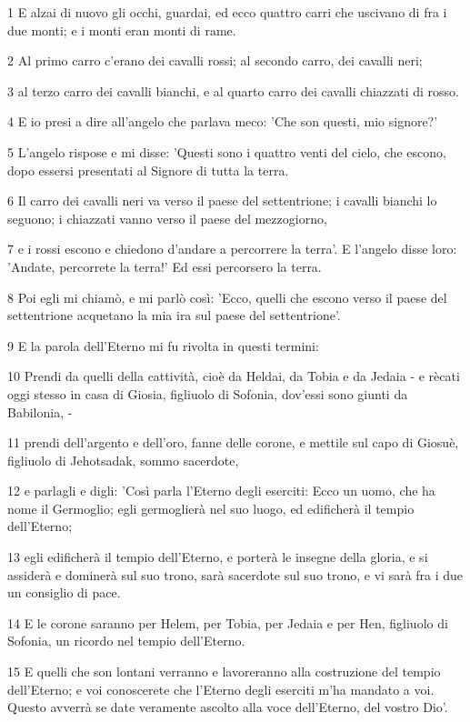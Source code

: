 \par 1 E alzai di nuovo gli occhi, guardai, ed ecco quattro carri che uscivano di fra i due monti; e i monti eran monti di rame.
\par 2 Al primo carro c'erano dei cavalli rossi; al secondo carro, dei cavalli neri;
\par 3 al terzo carro dei cavalli bianchi, e al quarto carro dei cavalli chiazzati di rosso.
\par 4 E io presi a dire all'angelo che parlava meco: 'Che son questi, mio signore?'
\par 5 L'angelo rispose e mi disse: 'Questi sono i quattro venti del cielo, che escono, dopo essersi presentati al Signore di tutta la terra.
\par 6 Il carro dei cavalli neri va verso il paese del settentrione; i cavalli bianchi lo seguono; i chiazzati vanno verso il paese del mezzogiorno,
\par 7 e i rossi escono e chiedono d'andare a percorrere la terra'. E l'angelo disse loro: 'Andate, percorrete la terra!' Ed essi percorsero la terra.
\par 8 Poi egli mi chiamò, e mi parlò così: 'Ecco, quelli che escono verso il paese del settentrione acquetano la mia ira sul paese del settentrione'.
\par 9 E la parola dell'Eterno mi fu rivolta in questi termini:
\par 10 Prendi da quelli della cattività, cioè da Heldai, da Tobia e da Jedaia - e rècati oggi stesso in casa di Giosia, figliuolo di Sofonia, dov'essi sono giunti da Babilonia, -
\par 11 prendi dell'argento e dell'oro, fanne delle corone, e mettile sul capo di Giosuè, figliuolo di Jehotsadak, sommo sacerdote,
\par 12 e parlagli e digli: 'Così parla l'Eterno degli eserciti: Ecco un uomo, che ha nome il Germoglio; egli germoglierà nel suo luogo, ed edificherà il tempio dell'Eterno;
\par 13 egli edificherà il tempio dell'Eterno, e porterà le insegne della gloria, e si assiderà e dominerà sul suo trono, sarà sacerdote sul suo trono, e vi sarà fra i due un consiglio di pace.
\par 14 E le corone saranno per Helem, per Tobia, per Jedaia e per Hen, figliuolo di Sofonia, un ricordo nel tempio dell'Eterno.
\par 15 E quelli che son lontani verranno e lavoreranno alla costruzione del tempio dell'Eterno; e voi conoscerete che l'Eterno degli eserciti m'ha mandato a voi. Questo avverrà se date veramente ascolto alla voce dell'Eterno, del vostro Dio'.

